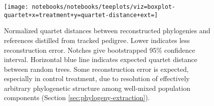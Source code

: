 \begin{figure}
  \centering
  \texttt{[image: notebooks/notebooks/teeplots/viz=boxplot-quartet+x=treatment+y=quartet-distance+ext=]}
  \caption{
    Normalized quartet distances between reconstructed phylogenies and references distilled from tracked pedigree.
    Lower indicates less reconstruction error.
    Notches give bootstrapped 95\% confidence interval.
    Horizontal blue line indicates expected quartet distance between random trees.
    Some reconstruction error is expected, especially in control treatment, due to resolution of effectively arbitrary phylogenetic structure among well-mixed population components (Section \ref{sec:phylogeny-extraction}).
  }
  \label{fig:species-reconstruction-error}
\end{figure}
